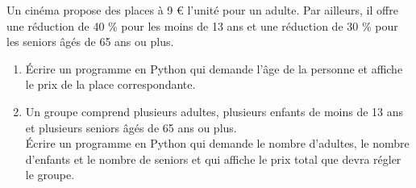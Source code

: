 
%
Un cinéma propose des places à 9 € l'unité pour un adulte. Par ailleurs, il offre une réduction de 40 \% pour les moins de 13 ans et une réduction de 30 \% pour les seniors âgés de 65 ans ou plus.
\begin{enumerate}
     \item
     Écrire un programme en Python qui demande l'âge de la personne et affiche le prix de la place correspondante.
     \item
     Un groupe comprend plusieurs adultes, plusieurs enfants de moins de 13 ans et plusieurs seniors âgés de 65 ans ou plus.\\
     Écrire un programme en Python qui demande le nombre d'adultes, le nombre d'enfants et le nombre de seniors et qui affiche le prix total que devra régler le groupe.
\end{enumerate}
